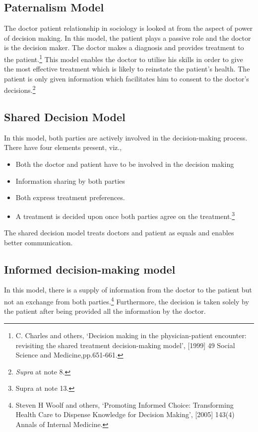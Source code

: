 \begin{multicols}{2}
\subsection*{Paternalism Model}

\noi
The doctor patient relationship in sociology is looked at from the aspect of power of
decision making. In this model, the patient plays a passive role and the doctor is the
decision maker. The doctor makes a diagnosis and provides treatment to the
patient.\footnote{C. Charles and others, ‘Decision making in the physician-patient encounter: revisiting the shared treatment decision-making model’, [1999] 49 Social Science and Medicine,pp.651-661.} This model enables the doctor to utilise his skills in order to give the most effective treatment which is likely to reinstate the patient's health. The patient is only given information which facilitates him to consent to the doctor's decisions.\footnote{\textit{Supra} at note 8.}

\subsection*{Shared Decision Model}

\noi
In this model, both parties are actively involved in the decision-making process. There
have four elements present, viz.,

\begin{itemize}
\item Both the doctor and patient have to be involved in the decision making

\item Information sharing by both parties

\item Both express treatment preferences.

\item A treatment is decided upon once both parties agree on the treatment.\footnote{Supra at note 13.}
\end{itemize}

\noi
The shared decision model treats doctors and patient as equals and enables better
communication.

\subsection*{Informed decision-making model}

\noi
In this model, there is a supply of information from the doctor to the patient but not an
exchange from both parties.\footnote{Steven H Woolf and others, ‘Promoting Informed Choice: Transforming Health Care to Dispense Knowledge for Decision Making’, [2005] 143(4) Annals of Internal Medicine.} Furthermore, the decision is taken solely by the patient after being provided all the information by the doctor.


\end{multicols}
